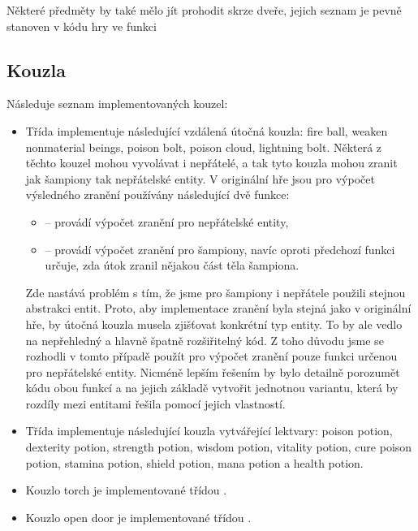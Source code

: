 Některé předměty by také mělo jít prohodit skrze dveře, jejich seznam je pevně stanoven v kódu hry \cite{DMDecompilation} ve funkci  

\subsection{Kouzla}

Následuje seznam implementovaných kouzel:
\begin{itemize}
\item Třída  implementuje následující vzdálená útočná kouzla: fire ball, weaken nonmaterial beings,
	poison bolt,  poison cloud,  lightning bolt. Některá z těchto kouzel mohou vyvolávat i nepřátelé, a tak tyto kouzla mohou zranit jak šampiony tak 
	nepřátelské entity. V originální hře jsou pro výpočet výsledného zranění používány následující dvě funkce:
	\begin{itemize}
	\item {} -- provádí výpočet zranění pro nepřátelské entity,
	\item {} -- provádí výpočet zranění pro šampiony, navíc oproti předchozí funkci určuje, zda 
	útok zranil nějakou část těla šampiona.
	\end{itemize}
	Zde nastává problém s tím, že jsme pro šampiony i nepřátele použili stejnou abstrakci entit. Proto, aby implementace zranění byla stejná jako v originální hře,
	by útočná kouzla musela zjišťovat konkrétní typ entity. To by ale vedlo na nepřehledný a hlavně špatně rozšiřitelný kód. Z toho důvodu jsme
	se rozhodli v tomto případě použít pro výpočet zranění pouze funkci určenou pro nepřátelské entity. Nicméně lepším řešením by bylo detailně porozumět
	kódu obou funkcí a na jejich základě vytvořit jednotnou variantu, která by rozdíly mezi entitami řešila pomocí jejich vlastností.

\item Třída  implementuje následující kouzla vytvářející lektvary: poison potion, dexterity potion, strength potion, wisdom potion,
	vitality potion, cure poison potion, stamina potion, shield potion, mana potion a health potion.

\item Kouzlo torch je implementované třídou .
\item Kouzlo open door je implementované třídou .
\end{itemize}

